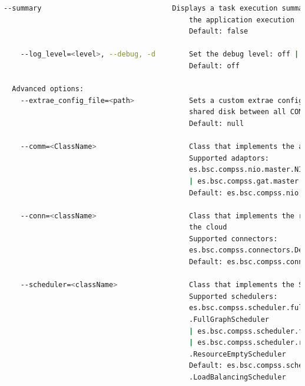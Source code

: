 \begin{lstlisting}[language=bash]
    --summary                               Displays a task execution summary at the end of 
                                            the application execution
                                            Default: false
                                            
    --log_level=<level>, --debug, -d        Set the debug level: off | info | debug
                                            Default: off

  Advanced options:
    --extrae_config_file=<path>             Sets a custom extrae config file. Must be in a 
                                            shared disk between all COMPSs workers.
                                            Default: null
                                            
    --comm=<ClassName>                      Class that implements the adaptor for communications
                                            Supported adaptors: 
                                            es.bsc.compss.nio.master.NIOAdaptor 
                                            | es.bsc.compss.gat.master.GATAdaptor
                                            Default: es.bsc.compss.nio.master.NIOAdaptor
                                            
    --conn=<className>                      Class that implements the runtime connector for 
                                            the cloud
                                            Supported connectors: 
                                            es.bsc.compss.connectors.DefaultSSHConnector
                                            Default: es.bsc.compss.connectors.DefaultSSHConnector
                                            
    --scheduler=<className>                 Class that implements the Scheduler for COMPSs
                                            Supported schedulers: 
                                            es.bsc.compss.scheduler.fullGraphScheduler
                                            .FullGraphScheduler
                                            | es.bsc.compss.scheduler.fifoScheduler.FIFOScheduler
                                            | es.bsc.compss.scheduler.resourceEmptyScheduler
                                            .ResourceEmptyScheduler
                                            Default: es.bsc.compss.scheduler.loadBalancingScheduler
                                            .LoadBalancingScheduler
                                            

\end{lstlisting}
